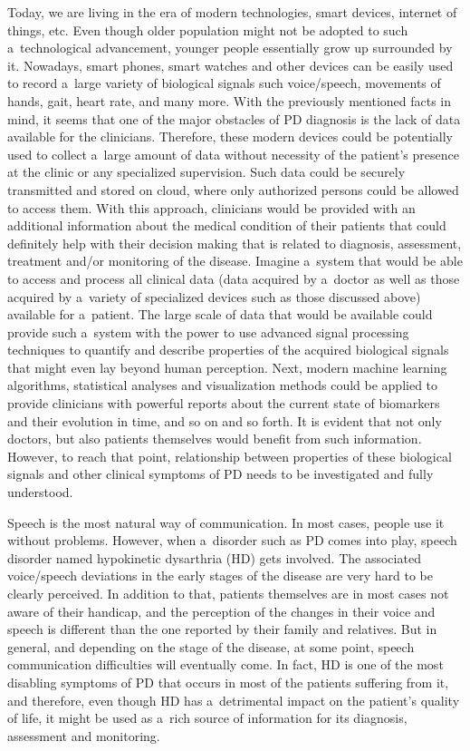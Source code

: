 Today, we are living in the era of modern technologies, smart devices, internet of things, etc. Even though older population might not be adopted to such a~technological advancement, younger people essentially grow up surrounded by it. Nowadays, smart phones, smart watches and other devices can be easily used to record a~large variety of biological signals such voice/speech, movements of hands, gait, heart rate, and many more. With the previously mentioned facts in mind, it seems that one of the major obstacles of PD diagnosis is the lack of data available for the clinicians. Therefore, these modern devices could be potentially used to collect a~large amount of data without necessity of the patient's presence at the clinic or any specialized supervision. Such data could be securely transmitted and stored on cloud, where only authorized persons could be allowed to access them. With this approach, clinicians would be provided with an additional information about the medical condition of their patients that could definitely help with their decision making that is related to diagnosis, assessment, treatment and/or monitoring of the disease. Imagine a~system that would be able to access and process all clinical data (data acquired by a~doctor as well as those acquired by a~variety of specialized devices such as those discussed above) available for a~patient. The large scale of data that would be available could provide such a~system with the power to use advanced signal processing techniques to quantify and describe properties of the acquired biological signals that might even lay beyond human perception. Next, modern machine learning algorithms, statistical analyses and visualization methods could be applied to provide clinicians with powerful reports about the current state of biomarkers and their evolution in time, and so on and so forth. It is evident that not only doctors, but also patients themselves would benefit from such information. However, to reach that point, relationship between properties of these biological signals and other clinical symptoms of PD needs to be investigated and fully understood.

Speech is the most natural way of communication. In most cases, people use it without problems. However, when a~disorder such as PD comes into play, speech disorder named hypokinetic dysarthria (HD) gets involved. The associated voice/speech deviations in the early stages of the disease are very hard to be clearly perceived. In addition to that, patients themselves are in most cases not aware of their handicap, and the perception of the changes in their voice and speech is different than the one reported by their family and relatives. But in general, and depending on the stage of the disease, at some point, speech communication difficulties will eventually come. In fact, HD is one of the most disabling symptoms of PD that occurs in most of the patients suffering from it, and therefore, even though HD has a~detrimental impact on the patient's quality of life, it might be used as a~rich source of information for its diagnosis, assessment and monitoring.

